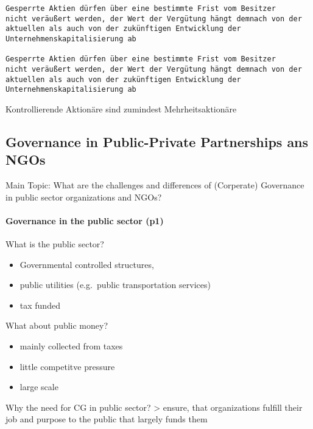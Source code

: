 \documentclass[
]{article}
\providecommand{\tightlist}{%
  \setlength{\itemsep}{0pt}\setlength{\parskip}{0pt}}
\begin{document}
\begin{verbatim}
Gesperrte Aktien dürfen über eine bestimmte Frist vom Besitzer
nicht veräußert werden, der Wert der Vergütung hängt demnach von der
aktuellen als auch von der zukünftigen Entwicklung der
Unternehmenskapitalisierung ab

Gesperrte Aktien dürfen über eine bestimmte Frist vom Besitzer
nicht veräußert werden, der Wert der Vergütung hängt demnach von der
aktuellen als auch von der zukünftigen Entwicklung der
Unternehmenskapitalisierung ab
\end{verbatim}

Kontrollierende Aktionäre sind zumindest Mehrheitsaktionäre

\hypertarget{governance-in-public-private-partnerships-ans-ngos}{%
\subsection{Governance in Public-Private Partnerships ans
NGOs}\label{governance-in-public-private-partnerships-ans-ngos}}

Main Topic: What are the challenges and differences of (Corperate)
Governance in public sector organizations and NGOs?

\hypertarget{governance-in-the-public-sector-p1}{%
\paragraph{Governance in the public sector
(p1)}\label{governance-in-the-public-sector-p1}}

What is the public sector?

\begin{itemize}
\tightlist
\item
  Governmental controlled structures,
\item
  public utilities (e.g.~public transportation services)
\item
  tax funded
\end{itemize}

What about public money?

\begin{itemize}
\tightlist
\item
  mainly collected from taxes
\item
  little competitve pressure
\item
  large scale
\end{itemize}

Why the need for CG in public sector? \textgreater{} ensure, that
organizations fulfill their job and purpose to the public that largely
funds them
\end{document}
